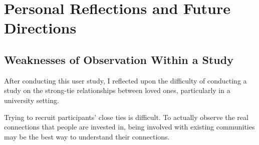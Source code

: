 \section{Personal Reflections and Future Directions}
  \subsection{Weaknesses of Observation Within a Study}
		After conducting this user study, I reflected upon the difficulty of
		conducting a study on the strong-tie relationships between
		loved ones, particularly in a university setting.

		Trying to recruit participants' close ties is difficult.
		To actually observe the real connections that people are invested in,
		being involved with existing communities may be the best way
		to understand their connections.

